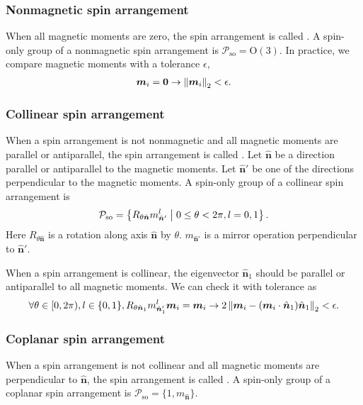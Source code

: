 \subsubsection{Nonmagnetic spin arrangement}

When all magnetic moments are zero, the spin arrangement is called .
A spin-only group of a nonmagnetic spin arrangement is $\mathcal{P}_{\mathrm{so}} = \mathrm{O}(3)$.
In practice, we compare magnetic moments with a tolerance $\epsilon$,
\begin{align}
  \bm{m}_{i} = \bm{0} \rightarrow \left\lVert \bm{m}_{i} \right\rVert_{2} < \epsilon.
\end{align}

\subsubsection{Collinear spin arrangement}

When a spin arrangement is not nonmagnetic and all magnetic moments are parallel or antiparallel, the spin arrangement is called .
Let $\hat{\bm{n}}$ be a direction parallel or antiparallel to the magnetic moments.
Let $\hat{\bm{n}}'$ be one of the directions perpendicular to the magnetic moments.
A spin-only group of a collinear spin arrangement is
\begin{align*}
  \mathcal{P}_{\mathrm{so}}
    = \left\{  R_{\theta \hat{\bm{n}}} m_{\hat{\bm{n}}'}^{l}  \mathrel{}\middle|\mathrel{}  0 \leq \theta < 2 \pi, l=0, 1  \right\}.
\end{align*}
Here $R_{\theta \hat{\bm{n}}}$ is a rotation along axis $\hat{\bm{n}}$ by $\theta$.
$m_{\hat{\bm{n}}'}$ is a mirror operation perpendicular to $\hat{\bm{n}}'$.

When a spin arrangement is collinear, the eigenvector $\hat{\bm{n}}_{1}$ should be parallel or antiparallel to all magnetic moments.
We can check it with tolerance as
\begin{align}
  \forall \theta \in [0, 2 \pi ), l \in \{ 0, 1 \}, R_{\theta \hat{\bm{n}}_{1}} m_{\hat{\bm{n}}_{1}'}^{l} \bm{m}_{i} = \bm{m}_{i}
  \rightarrow
  2 \left\lVert \bm{m}_{i} - (\bm{m}_{i} \cdot \hat{\bm{n}}_{1})\hat{\bm{n}}_{1} \right\rVert_{2} < \epsilon.
\end{align}

\subsubsection{Coplanar spin arrangement}

When a spin arrangement is not collinear and all magnetic moments are perpendicular to $\hat{\bm{n}}$, the spin arrangement is called .
A spin-only group of a coplanar spin arrangement is $\mathcal{P}_{\mathrm{so}} = \{ 1, m_{\hat{\bm{n}}} \}$.


